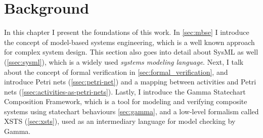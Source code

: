 \chapter{Background}\label{ch:background}

In this chapter I present the foundations of this work. In \autoref{sec:mbse} I introduce the concept of model-based systems engineering, which is a well known approach for complex system design. This section also goes into detail about SysML as well (\autoref{ssec:sysml}), which is a widely used \emph{systems modeling language}. Next, I talk about the concept of formal verification in \autoref{sec:formal_verification}, and introduce Petri nets (\autoref{ssec:petri-net}) and a mapping between activities and Petri nets (\autoref{ssec:activities-as-petri-nets}). Lastly, I introduce the Gamma Statechart Composition Framework, which is a tool for modeling and verifying composite systems using statechart behaviours \autoref{sec:gamma}, and a low-level formalism called XSTS (\autoref{sec:xsts}), used as an intermediary language for model checking by Gamma.


%





